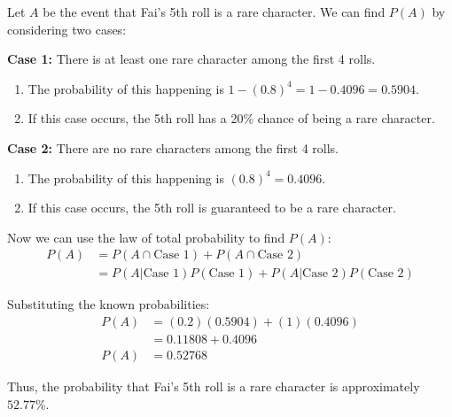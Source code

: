 \documentclass[a4paper, 10pt]{article}
\begin{document}
\begin{solution}
	Let \( A \) be the event that Fai's 5th roll is a rare character. \newline
	We can find \( P(A) \) by considering two cases:
	
	\myspace

	\par\noindent\textbf{Case 1:} There is at least one rare character among the first 4 rolls.
	\begin{enumerate}
		\item The probability of this happening is \( 1 - (0.8)^4 = 1 - 0.4096 = 0.5904 \).
		\item If this case occurs, the 5th roll has a 20\% chance of being a rare character.
	\end{enumerate}

	\par\noindent\textbf{Case 2:} There are no rare characters among the first 4 rolls.
	\begin{enumerate}
		\item The probability of this happening is \( (0.8)^4 = 0.4096 \).
		\item If this case occurs, the 5th roll is guaranteed to be a rare character.
	\end{enumerate}

	\newpage

	Now we can use the law of total probability to find \( P(A) \):
	\begin{align*}
		P(A) & = P(A \cap \text{Case 1}) + P(A \cap \text{Case 2})                           \\
		     & = P(A | \text{Case 1})P(\text{Case 1}) + P(A | \text{Case 2})P(\text{Case 2})
	\end{align*}

	Substituting the known probabilities:
	\begin{align*}
		P(A) & = (0.2)(0.5904) + (1)(0.4096) \\
		     & = 0.11808 + 0.4096            \\
		P(A) & = 0.52768
	\end{align*}

	Thus, the probability that Fai's 5th roll is a rare character is approximately \( \boxed{52.77\%} \).
\end{solution}
\end{document}

